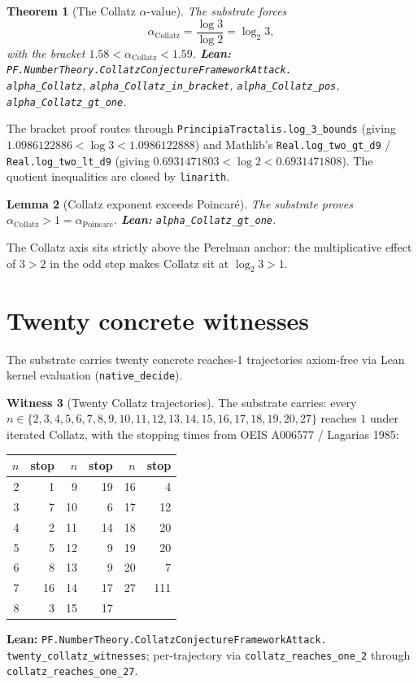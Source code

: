 \documentclass[11pt,a4paper]{article}
\theoremstyle{plain}
\newtheorem{theorem}{Theorem}[section]
\newtheorem{lemma}[theorem]{Lemma}
\theoremstyle{definition}
\newtheorem{witness}[theorem]{Witness}
\begin{document}
\begin{theorem}[The Collatz $\alpha$-value]
\label{thm:alpha-collatz}
The substrate forces
\[
\alpha_{\mathrm{Collatz}} = \frac{\log 3}{\log 2} = \log_{2} 3,
\]
with the bracket
$1.58 < \alpha_{\mathrm{Collatz}} < 1.59$.
\textbf{Lean:}
\texttt{PF.NumberTheory.CollatzConjectureFrameworkAttack.\\
alpha\_Collatz},
\texttt{alpha\_Collatz\_in\_bracket},
\texttt{alpha\_Collatz\_pos},
\texttt{alpha\_Collatz\_gt\_one}.
\end{theorem}

The bracket proof routes through
\texttt{PrincipiaTractalis.log\_3\_bounds} (giving
$1.0986122886 < \log 3 < 1.0986122888$) and Mathlib's
\texttt{Real.log\_two\_gt\_d9} / \texttt{Real.log\_two\_lt\_d9}
(giving $0.6931471803 < \log 2 < 0.6931471808$). The quotient
inequalities are closed by \texttt{linarith}.

\begin{lemma}[Collatz exponent exceeds Poincar\'e]
\label{lem:collatz-gt-one}
The substrate proves
$\alpha_{\mathrm{Collatz}} > 1 = \alpha_{\mathrm{Poincar\acute e}}$.
\textbf{Lean:} \texttt{alpha\_Collatz\_gt\_one}.
\end{lemma}

The Collatz axis sits strictly above the Perelman anchor: the
multiplicative effect of $3 > 2$ in the odd step makes Collatz
sit at $\log_{2} 3 > 1$.

\section{Twenty concrete witnesses}

The substrate carries twenty concrete reaches-1 trajectories
axiom-free via Lean kernel evaluation (\texttt{native\_decide}).

\begin{witness}[Twenty Collatz trajectories]
\label{wit:twenty}
The substrate carries: every $n \in \{2, 3, 4, 5, 6, 7, 8, 9, 10,
11, 12, 13, 14, 15, 16, 17, 18, 19, 20, 27\}$ reaches $1$ under
iterated Collatz, with the stopping times from OEIS A006577 /
Lagarias 1985:
\begin{center}
\begin{tabular}{rrr|rrr}
\toprule
$n$ & stop & $n$ & stop & $n$ & stop \\
\midrule
2 & 1   & 9  & 19  & 16 & 4   \\
3 & 7   & 10 & 6   & 17 & 12  \\
4 & 2   & 11 & 14  & 18 & 20  \\
5 & 5   & 12 & 9   & 19 & 20  \\
6 & 8   & 13 & 9   & 20 & 7   \\
7 & 16  & 14 & 17  & 27 & 111 \\
8 & 3   & 15 & 17  &    &     \\
\bottomrule
\end{tabular}
\end{center}
\textbf{Lean:}
\texttt{PF.NumberTheory.CollatzConjectureFrameworkAttack.\\
twenty\_collatz\_witnesses}; per-trajectory via
\texttt{collatz\_reaches\_one\_2} through
\texttt{collatz\_reaches\_one\_27}.
\end{witness}
\end{document}
